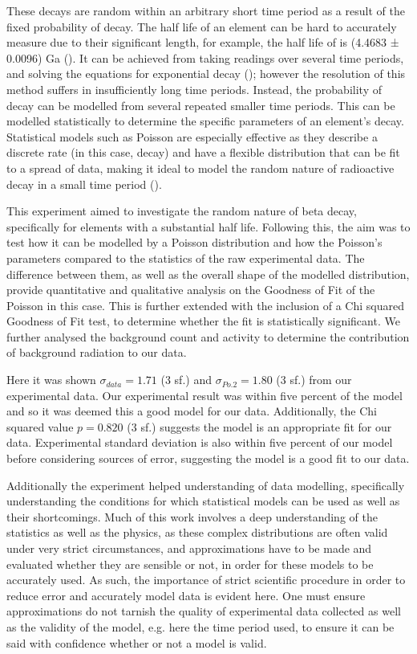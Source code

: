 \documentclass[11pt]{article}
\begin{document}
\noindent These decays are random within an arbitrary short time period as a result of the fixed probability of decay. The half life of an element can be hard to accurately measure due to their significant length, for example, the half life of  is (4.4683 ± 0.0096) Ga (\cite{U238}).  It can be achieved from taking readings over several time periods, and solving the equations for exponential decay (\cite{YF}); however the resolution of this method suffers in insufficiently long time periods. Instead, the probability of decay can be modelled from several repeated smaller time periods. This can be modelled statistically to determine the  specific parameters of an element's decay. Statistical models such as Poisson are especially effective as they describe a discrete rate (in this case, decay) and have a flexible distribution that can be fit to a spread of data, making it ideal to model the random nature of radioactive decay in a small time period (\cite{thompson2001poisson}). 
    
\noindent This experiment aimed to investigate the random nature of beta decay, specifically for elements with a substantial half life. Following this, the aim was to test how it can be modelled by a Poisson distribution and how the Poisson's parameters compared to the statistics of the raw experimental data. The difference between them, as well as the overall shape of the modelled distribution, provide quantitative and qualitative analysis on the Goodness of Fit of the Poisson in this case. This is further extended with the inclusion of a Chi squared Goodness of Fit test, to determine whether the fit is statistically significant.  We further analysed the background count and activity to determine the contribution of background radiation to our data. 
    
\noindent Here it was shown $\sigma_{data} = 1.71$ (3 sf.) and $\sigma_{Po.2} = 1.80$ (3 sf.) from our experimental data. Our experimental result was within five percent of the model and so it was deemed this a good model for our data. Additionally, the Chi squared value $p = 0.820$ (3 sf.) suggests the model is an appropriate fit for our data. Experimental standard deviation is also within five percent of our model before considering sources of error, suggesting the model is a good fit to our data. 
    
\noindent Additionally the experiment helped understanding of data modelling, specifically understanding the conditions for which statistical models can be used as well as their shortcomings. Much of this work involves a deep understanding of the statistics as well as the physics, as these complex distributions are often valid under very strict circumstances, and approximations have to be made and evaluated whether they are sensible or not, in order for these models to be accurately used.
\noindent As such, the importance of strict scientific procedure in order to reduce error and accurately model data is evident here. One must ensure approximations do not tarnish the quality of experimental data collected as well as the validity of the model, e.g. here the time period used, to ensure it can be said with confidence whether or not a model is valid. 
\end{document}
